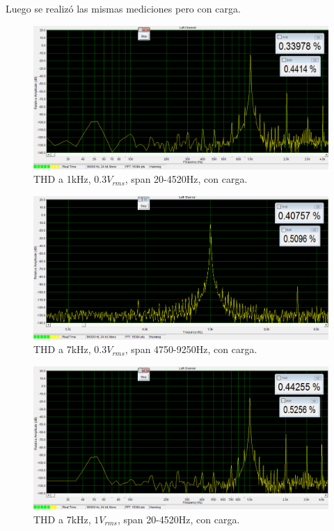 Luego se realizó las mismas mediciones pero con carga.

\begin{figure}[H]
\centering
\includegraphics[width=\textwidth]{img/Distorsion/THD_1k_03V_carga_span_20_4520.png}
\caption{THD a 1kHz, $0.3V_{rms}$, span 20-4520Hz, con carga.}
\label{THD5} 
\end{figure}

\begin{figure}[H]
\centering
\includegraphics[width=\textwidth]{img/Distorsion/THD_7k_03V_carga_span_4750_9250.png}
\caption{THD a 7kHz, $0.3V_{rms}$, span 4750-9250Hz, con carga.}
\label{THD6} 
\end{figure}

\begin{figure}[H]
\centering
\includegraphics[width=\textwidth]{img/Distorsion/THD_1k_1V_carga_span_20_4520.png}
\caption{THD a 7kHz, $1V_{rms}$, span 20-4520Hz, con carga.}
\label{THD7} 
\end{figure}

